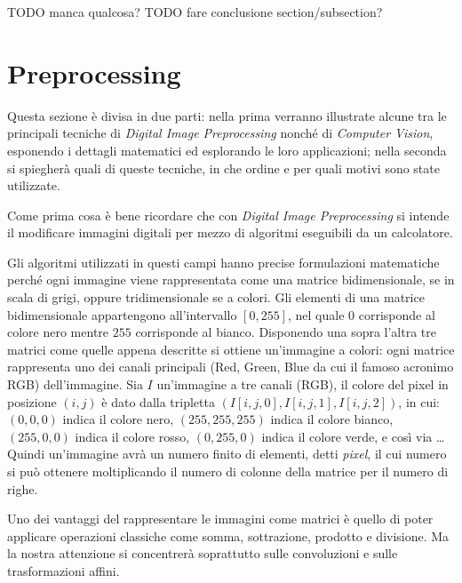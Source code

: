 TODO manca qualcosa?
TODO fare conclusione section/subsection?




\section{Preprocessing}
Questa sezione è divisa in due parti: nella prima verranno illustrate alcune tra le principali tecniche di \textit{Digital Image Preprocessing} nonché di \textit{Computer Vision}, esponendo i dettagli matematici ed esplorando le loro applicazioni; nella seconda si spiegherà quali di queste tecniche, in che ordine e per quali motivi sono state utilizzate.

Come prima cosa è bene ricordare che con \textit{Digital Image Preprocessing} si intende il modificare immagini digitali per mezzo di algoritmi eseguibili da un calcolatore.

Gli algoritmi utilizzati in questi campi hanno precise formulazioni matematiche perché ogni immagine viene rappresentata come una matrice bidimensionale, se in scala di grigi, oppure tridimensionale se a colori.
Gli elementi di una matrice bidimensionale appartengono all'intervallo $[0,255]$, nel quale $0$ corrisponde al colore nero mentre $255$ corrisponde al bianco.
Disponendo una sopra l'altra tre matrici come quelle appena descritte si ottiene un'immagine a colori: ogni matrice rappresenta uno dei canali principali (Red, Green, Blue da cui il famoso acronimo RGB) dell'immagine.
Sia $I$ un'immagine a tre canali (RGB), il colore del pixel in posizione $(i,j)$ è dato dalla tripletta $(I[i,j,0], I[i,j,1], I[i,j,2])$, in cui: $(0,0,0)$ indica il colore nero, $(255,255,255)$ indica il colore bianco, $(255,0,0)$ indica il colore rosso, $(0,255,0)$ indica il colore verde, e così via \dots
Quindi un'immagine avrà un numero finito di elementi, detti \textit{pixel}, il cui numero si può ottenere moltiplicando il numero di colonne della matrice per il numero di righe.


Uno dei vantaggi del rappresentare le immagini come matrici è quello di poter applicare operazioni classiche come somma, sottrazione, prodotto e divisione.
Ma la nostra attenzione si concentrerà soprattutto sulle convoluzioni e sulle trasformazioni affini.

